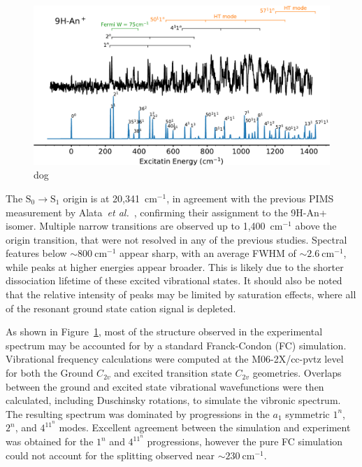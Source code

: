 \documentclass[journal=jpcafh,manuscript=article,layout=onecolumn, 12pt]{achemso}
\begin{document}
\begin{figure} [h]
	\includegraphics[width=1\textwidth]{figures/9H-An+sw}
	\caption{dog}
	\label{Fig:4}
\end{figure}

The $\text{S}_0\rightarrow \text{S}_1$ origin is at 20,341~cm$^{-1}$, in agreement with the previous PIMS measurement by Alata~\emph{et al.}~\cite{ala10}, confirming their assignment to the 9H-An+ isomer. Multiple narrow transitions are observed up to 1,400~cm$^{-1}$ above the origin transition, that were not resolved in any of the previous studies. Spectral features below $\sim800~$cm$^{-1}$ appear sharp, with an average FWHM of $\sim 2.6~$cm$^{-1}$, while peaks at higher energies appear broader. This is likely due to the shorter dissociation lifetime of these excited vibrational states. It should also be noted that the relative intensity of peaks may be limited by saturation effects, where all of the resonant ground state cation signal is depleted.

As shown in Figure~\ref{Fig:4}, most of the structure observed in the experimental spectrum may be accounted for by a standard Franck-Condon (FC) simulation. Vibrational frequency calculations were computed at the M06-2X/cc-pvtz level for both the Ground $C_{2v}$ and excited transition state $C_{2v}$ geometries. Overlaps between the ground and excited state vibrational wavefunctions were then calculated, including Duschinsky rotations, to simulate the vibronic spectrum. The resulting spectrum was dominated by progressions in the $a_1$ symmetric $1^n$, $2^n$, and $4^11^n$ modes. Excellent agreement between the simulation and experiment was obtained for the $1^n$ and $4^11^n$ progressions, however the pure FC simulation could not account for the splitting observed near $\sim230~$cm$^{-1}$. 
\end{document}
